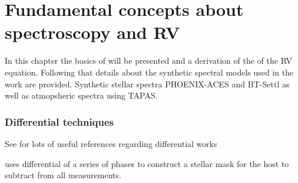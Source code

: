 
\chapter{Fundamental concepts about spectroscopy and RV}
\label{cha:concepts}

In this chapter the basics of \nir{} will be presented and a derivation of the of the RV equation. Following that details about the synthetic spectral models used in the work are provided. Synthetic stellar spectra {PHOENIX-ACES} and {BT-Settl} as well as atmopsheric spectra using {TAPAS}.










\subsection{Differential techniques}
See \citet{kostogryz_spectral_2013} for lots of useful references regarding differential works \citet{simon_disentangling_1994}

\citet{rodler_weighing_2012} uses differential of a series of phases to construct a stellar mask for the host to subtract from all measurements.